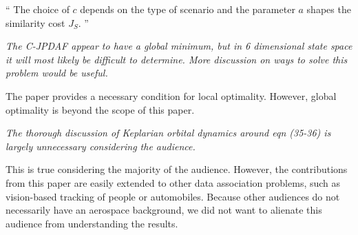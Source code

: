 \documentclass[11pt]{article}
\newenvironment{correction}{\begin{list}{}{\setlength{\leftmargin}{1cm}\setlength{\rightmargin}{1cm}}\vspace{\parsep}\item[]``}{''\end{list}}
\begin{document}
\begin{itemize}
\begin{correction}
The choice of $c$ depends on the type of scenario and the parameter $a$ shapes the similarity cost $J_S$.
\end{correction}

\item {\itshape The C-JPDAF appear to have a global minimum, but in 6 dimensional state space it will most likely be difficult to determine.  More discussion on ways to solve this problem would be useful.}

The paper provides a necessary condition for local optimality. However, global optimality is beyond the scope of this paper.

\item {\itshape The thorough discussion of Keplarian orbital dynamics around eqn (35-36) is largely unnecessary considering the audience.}

This is true considering the majority of the audience. However, the contributions from this paper are easily extended to other data association problems, such as vision-based tracking of people or automobiles. Because other audiences do not necessarily have an aerospace background, we did not want to alienate this audience from understanding the results.














\end{itemize}
\end{document}
